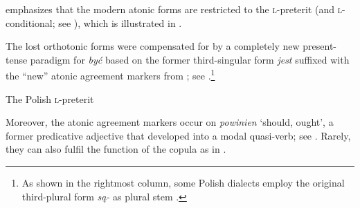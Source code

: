 \documentclass[output=paper]{langscibook}
\begin{document}
\citet{Embick1995} emphasizes that the modern atonic forms are restricted to the \textsc{l-}preterit (and \textsc{l-}conditional; see ), which is illustrated in .

The lost orthotonic forms were compensated for by a completely new present-tense paradigm for \textit{być} based on the former third-singular form \textit{jest} suffixed with the ``new'' atonic agreement markers from ; see .\footnote{As shown in the rightmost column, some Polish dialects employ the original third-plural form \textit{są-} as plural stem \citep[42]{Migdalski2006}.}\largerpage[-1]


\begin{table}
\begin{floatrow}
\captionsetup{margin=.005\linewidth}
{\caption{The Polish \textsc{l-}preterit}\label{pitsch:tab:PolishPast}}
{\caption{Modern Polish present-tense \textit{być}-forms (full verb)}
\label{pitsch:tab:PolishFullVerb}}
\end{floatrow}
\end{table}

Moreover, the atonic agreement markers occur on \textit{powinien} `should, ought', a former predicative adjective that developed into a modal quasi-verb; see . Rarely, they can also fulfil the function of the copula as in .
\end{document}

